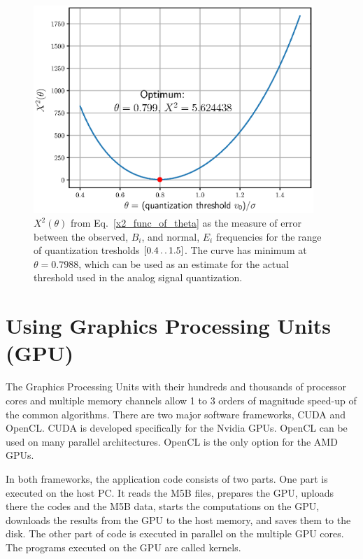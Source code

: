 \documentclass[letterpaper,twoside,12pt]{article}
\begin{document}
\begin{figure}[ht!]
  \begin{center}
  \includegraphics[width=25pc]{fig_optimal_quantization_threshold.eps}
  \caption{\small $X^2(\theta)$ from Eq.~\eqref{x2_func_of_theta} as the measure of error between the observed, $B_i$, and normal, $E_i$ frequencies for the range of quantization tresholds $[0.4 \mathinner{\ldotp\ldotp}1.5]$. The curve has minimum at $\theta = 0.7988$, which can be used as an estimate for the actual threshold used in the analog signal quantization.}
  \label{optimum_theta}
  \end{center}
\end{figure}


\section{Using Graphics Processing Units (GPU)}

The Graphics Processing Units with their hundreds and thousands of processor cores and multiple memory channels allow 1 to 3 orders of magnitude speed-up of the common algorithms. There are two major software frameworks, CUDA and OpenCL. CUDA is developed specifically for the Nvidia GPUs. OpenCL can be used on many parallel architectures. OpenCL is the only option for the AMD GPUs.

In both frameworks, the application code consists of two parts. One part is executed on the host PC. It reads the M5B files, prepares the GPU, uploads there the codes and the M5B data, starts the computations on the GPU, downloads the results from the GPU to the host memory, and saves them to the disk. The other part of code is executed in parallel on the multiple GPU cores. The programs executed on the GPU are called kernels. 
\end{document}
